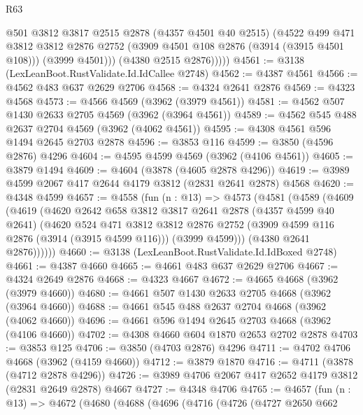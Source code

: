 \begin{lexlean}{R63}
\begin{coremodule}
              @501
              @3812
              @3817
              @2515
              @2878
              (@4357 @4501 @40 @2515)
              (@4522
                @499
                @471
                @3812
                @3812
                @2876
                @2752
                (@3909 @4501 @108 @2876 (@3914 (@3915 @4501 @108)))
                (@3999 @4501)))
            (@4380 @2515 @2876)))))
@4561 := @3138 (LexLeanBoot.RustValidate.Id.IdCallee @2748)
@4562 := @4387 @4561
@4566 := @4562 @483 @637 @2629 @2706
@4568 := @4324 @2641 @2876
@4569 := @4323 @4568
@4573 := @4566 @4569 (@3962 (@3979 @4561))
@4581 := @4562 @507 @1430 @2633 @2705 @4569 (@3962 (@3964 @4561))
@4589 := @4562 @545 @488 @2637 @2704 @4569 (@3962 (@4062 @4561))
@4595 := @4308 @4561 @596 @1494 @2645 @2703 @2878
@4596 := @3853 @116
@4599 := @3850 (@4596 @2876) @4296
@4604 := @4595 @4599 @4569 (@3962 (@4106 @4561))
@4605 := @3879 @1494
@4609 := @4604 (@3878 (@4605 @2878 @4296))
@4619 := @3989 @4599 @2067 @417 @2644 @4179 @3812 (@2831 @2641 @2878) @4568
@4620 := @4348 @4599
@4657 := @4558
    (fun (n : @13) =>
    @4573
      (@4581
        (@4589
          (@4609
            (@4619
              (@4620
                @2642
                @658
                @3812
                @3817
                @2641
                @2878
                (@4357 @4599 @40 @2641)
                (@4620
                  @524
                  @471
                  @3812
                  @3812
                  @2876
                  @2752
                  (@3909 @4599 @116 @2876 (@3914 (@3915 @4599 @116)))
                  (@3999 @4599)))
              (@4380 @2641 @2876))))))
@4660 := @3138 (LexLeanBoot.RustValidate.Id.IdBoxed @2748)
@4661 := @4387 @4660
@4665 := @4661 @483 @637 @2629 @2706
@4667 := @4324 @2649 @2876
@4668 := @4323 @4667
@4672 := @4665 @4668 (@3962 (@3979 @4660))
@4680 := @4661 @507 @1430 @2633 @2705 @4668 (@3962 (@3964 @4660))
@4688 := @4661 @545 @488 @2637 @2704 @4668 (@3962 (@4062 @4660))
@4696 := @4661 @596 @1494 @2645 @2703 @4668 (@3962 (@4106 @4660))
@4702 := @4308 @4660 @604 @1870 @2653 @2702 @2878
@4703 := @3853 @125
@4706 := @3850 (@4703 @2876) @4296
@4711 := @4702 @4706 @4668 (@3962 (@4159 @4660))
@4712 := @3879 @1870
@4716 := @4711 (@3878 (@4712 @2878 @4296))
@4726 := @3989 @4706 @2067 @417 @2652 @4179 @3812 (@2831 @2649 @2878) @4667
@4727 := @4348 @4706
@4765 := @4657
    (fun (n : @13) =>
    @4672
      (@4680
        (@4688
          (@4696
            (@4716
              (@4726
                (@4727
                  @2650
                  @662

\end{coremodule}
\end{lexlean}
